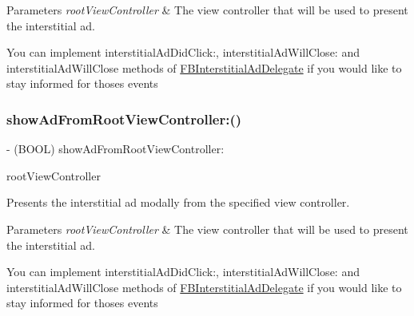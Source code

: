 \begin{DoxyParams}{Parameters}
{\em root\+View\+Controller} & The view controller that will be used to present the interstitial ad.\\
\hline
\end{DoxyParams}
You can implement {\ttfamily interstitial\+Ad\+Did\+Click\+:}, {\ttfamily interstitial\+Ad\+Will\+Close\+:} and {\ttfamily interstitial\+Ad\+Will\+Close} methods of {\ttfamily \hyperlink{classFBInterstitialAdDelegate-p}{F\+B\+Interstitial\+Ad\+Delegate}} if you would like to stay informed for thoses events \mbox{\label{interfaceFBInterstitialAd_ac9c071a5f699e990e1fa65060fe5c1ce}} 
\subsubsection{\texorpdfstring{show\+Ad\+From\+Root\+View\+Controller\+:()}{showAdFromRootViewController:()}\hspace{0.1cm}{\footnotesize\ttfamily [4/5]}}
{\footnotesize\ttfamily -\/ (B\+O\+OL) show\+Ad\+From\+Root\+View\+Controller\+: \begin{DoxyParamCaption}\item[{(U\+I\+View\+Controller $\ast$)}]{root\+View\+Controller }\end{DoxyParamCaption}}

Presents the interstitial ad modally from the specified view controller.


\begin{DoxyParams}{Parameters}
{\em root\+View\+Controller} & The view controller that will be used to present the interstitial ad.\\
\hline
\end{DoxyParams}
You can implement {\ttfamily interstitial\+Ad\+Did\+Click\+:}, {\ttfamily interstitial\+Ad\+Will\+Close\+:} and {\ttfamily interstitial\+Ad\+Will\+Close} methods of {\ttfamily \hyperlink{classFBInterstitialAdDelegate-p}{F\+B\+Interstitial\+Ad\+Delegate}} if you would like to stay informed for thoses events \mbox{\label{interfaceFBInterstitialAd_ac9c071a5f699e990e1fa65060fe5c1ce}} 
